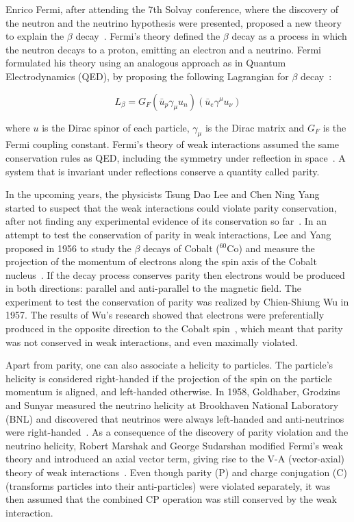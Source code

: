 Enrico Fermi, after attending the 7th Solvay conference, where the discovery of the neutron and the neutrino hypothesis were presented, proposed a new theory to explain the $\beta$ decay~\cite{FermiWeakTheory_1}. Fermi's theory defined the $\beta$ decay as a process in which the neutron decays to a proton, emitting an electron and a neutrino. Fermi formulated his theory using an analogous approach as in Quantum Electrodynamics (QED), by proposing the following Lagrangian for $\beta$ decay~\cite{FermiWeakTheory_2}:

\begin{equation}
L_{\beta}=G_{F}\left(\bar{u}_{p}\gamma_{\mu}u_{n}\right)\left(\bar{u}_{e}\gamma^{\mu}u_{\nu}\right)
\end{equation}

where $u$ is the Dirac spinor of each particle, $\gamma_{\mu}$ is the Dirac matrix and $G_{F}$ is the Fermi coupling constant. Fermi's theory of weak interactions assumed the same conservation rules as QED, including the symmetry under reflection in space~\cite{FermiWeakTheory_2}. A system that is invariant under reflections conserve a quantity called parity.

In the upcoming years, the physicists Tsung Dao Lee and Chen Ning Yang started to suspect that the weak interactions could violate parity conservation, after not finding any experimental evidence of its conservation so far~\cite{LeeYang}. In an attempt to test the conservation of parity in weak interactions, Lee and Yang proposed in 1956 to study the $\beta$ decays of Cobalt (${}^{60}$Co) and measure the projection of the momentum of electrons along the spin axis of the Cobalt nucleus~\cite{LeeYang}. If the decay process conserves parity then electrons would be produced in both directions: parallel and anti-parallel to the magnetic field. The experiment to test the conservation of parity was realized by Chien-Shiung Wu in 1957. The results of Wu's research showed that electrons were preferentially produced in the opposite direction to the Cobalt spin~\cite{WuParityViolation}, which meant that parity was not conserved in weak interactions, and even maximally violated.

Apart from parity, one can also associate a helicity to particles. The particle's helicity is considered right-handed if the projection of the spin on the particle momentum is aligned, and left-handed otherwise. In 1958, Goldhaber, Grodzins and Sunyar measured the neutrino helicity at Brookhaven National Laboratory (BNL) and discovered that neutrinos were always left-handed and anti-neutrinos were right-handed~\cite{NeutrinoHelicity}. As a consequence of the discovery of parity violation and the neutrino helicity, Robert Marshak and George Sudarshan modified Fermi's weak theory and introduced an axial vector term, giving rise to the V-A (vector-axial) theory of weak interactions~\cite{VATheory}. Even though parity (P) and charge conjugation (C) (transforms particles into their anti-particles) were violated separately, it was then assumed that the combined CP operation was still conserved by the weak interaction.

